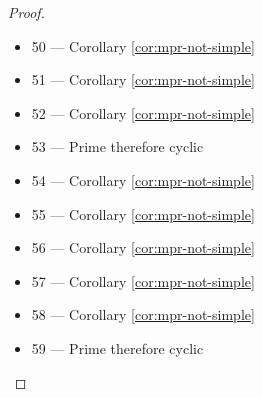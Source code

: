 \begin{proof}
\begin{itemize}
\item 50 --- Corollary \ref{cor:mpr-not-simple}
\item 51 --- Corollary \ref{cor:mpr-not-simple}
\item 52 --- Corollary \ref{cor:mpr-not-simple}
\item 53 --- Prime therefore cyclic
\item 54 --- Corollary \ref{cor:mpr-not-simple}
\item 55 --- Corollary \ref{cor:mpr-not-simple}
\item 56 --- Corollary \ref{cor:mpr-not-simple}
\item 57 --- Corollary \ref{cor:mpr-not-simple}
\item 58 --- Corollary \ref{cor:mpr-not-simple}
\item 59 --- Prime therefore cyclic
\end{itemize}
\end{proof}